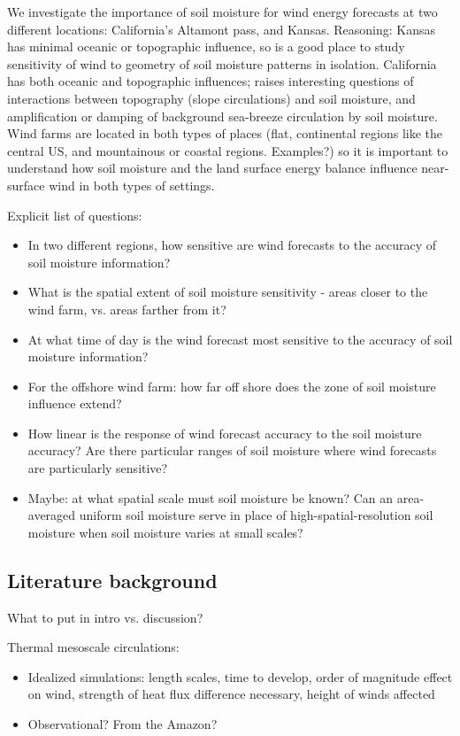 \documentclass[12pt]{amsart}
\begin{document}
We investigate the importance of soil moisture for wind energy forecasts at two different locations: California's Altamont pass, and Kansas.  Reasoning: Kansas has minimal oceanic or topographic influence, so is a good place to study sensitivity of wind to geometry of soil moisture patterns in isolation.  California has both oceanic and topographic influences; raises interesting questions of interactions between topography (slope circulations) and soil moisture, and amplification or damping of background sea-breeze circulation by soil moisture.  Wind farms are located in both types of places (flat, continental regions like the central US, and mountainous or coastal regions. Examples?) so it is important to understand how soil moisture and the land surface energy balance influence near-surface wind in both types of settings.

Explicit list of questions:
\begin{itemize}
\item In two different regions, how sensitive are wind forecasts to the accuracy of soil moisture information?
\item What is the spatial extent of soil moisture sensitivity - areas closer to the wind farm, vs. areas farther from it?
\item At what time of day is the wind forecast most sensitive to the accuracy of soil moisture information?
\item For the offshore wind farm: how far off shore does the zone of soil moisture influence extend?
\item How linear is the response of wind forecast accuracy to the soil moisture accuracy?  Are there particular ranges of soil moisture where wind forecasts are particularly sensitive?
\item Maybe: at what spatial scale must soil moisture be known?  Can an area-averaged uniform soil moisture serve in place of high-spatial-resolution soil moisture when soil moisture varies at small scales?
\end{itemize}


\subsection{Literature background}

What to put in intro vs. discussion?

Thermal mesoscale circulations:
\begin{itemize}
\item Idealized simulations: length scales, time to develop, order of magnitude effect on wind, strength of heat flux difference necessary, height of winds affected
\item Observational?  From the Amazon?
\end{itemize}
\end{document}

